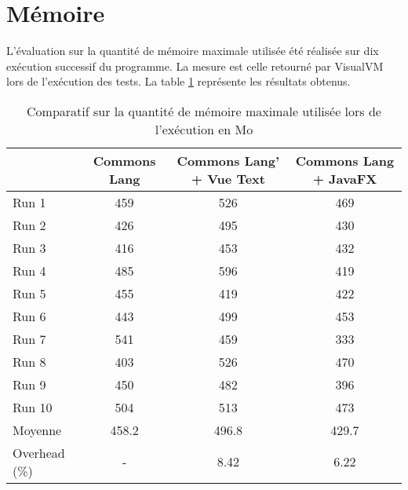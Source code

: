 \section{Mémoire}
\label{memoire}

L'évaluation sur la quantité de mémoire maximale utilisée été réalisée sur dix exécution successif du programme. La mesure est celle retourné par VisualVM lors de l'exécution des tests. La table \ref{evaluation_memoire} représente les résultats obtenus.

\begin{table}[h]
\centering
\begin{tabular}{|l|c|c|c|}
\hline
         & Commons Lang & Commons Lang' + Vue Text & Commons Lang + JavaFX\\
         \hline
Run 1     & 459  & 526       & 469        \\
Run 2     & 426  & 495       & 430        \\
Run 3     & 416  & 453       & 432        \\
Run 4     & 485  & 596       & 419        \\
Run 5     & 455  & 419       & 422        \\
Run 6     & 443  & 499       & 453        \\
Run 7     & 541  & 459       & 333        \\
Run 8     & 403  & 526       & 470        \\
Run 9     & 450  & 482       & 396        \\
Run 10    & 504  & 513       & 473        \\
\hline
Moyenne  & 458.2  & 496.8       & 429.7        \\
\hline
Overhead (\%) & -  & 8.42       & 6.22   \\
\hline    
\end{tabular}
\caption{Comparatif sur la quantité de mémoire maximale utilisée lors de l'exécution en Mo}
\label{evaluation_memoire}
\end{table}
